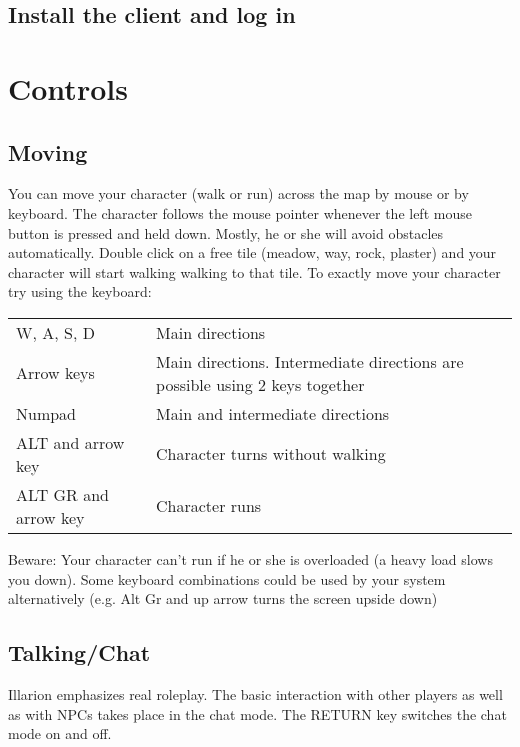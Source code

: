 \documentclass[a4paper,11pt]{scrreprt}
\begin{document}
\section{Install the client and log in}

\chapter{Controls}
\section{Moving}
You can move your character (walk or run) across the map by mouse or by keyboard. 
The character follows the mouse pointer whenever the left mouse button is pressed and held down. Mostly, he or she will 
avoid obstacles automatically. 
Double click  on a free tile (meadow, way, rock, plaster) and your character will start walking walking
to that tile. 
To exactly move your character try using the keyboard:
\begin{table}[h]
\begin{tabular}{ l p{14.5cm}}
W, A, S, D & Main directions \\
Arrow keys & Main directions. Intermediate directions are possible using 2 keys together  \\
Numpad & Main and intermediate directions \\
ALT and arrow key & Character turns without walking \\
ALT GR and arrow key & Character runs 
\end{tabular}
\end{table}

Beware: Your character can't run if he or she is overloaded (a heavy load slows you 
down). 
Some keyboard combinations could be used by your system alternatively 
(e.g. Alt Gr and up arrow turns the screen upside down)

\section{Talking/Chat}
Illarion emphasizes real roleplay. The basic interaction with other players as well as with NPCs 
takes place in the chat mode. The RETURN key switches the chat mode on and off.
\end{document}
